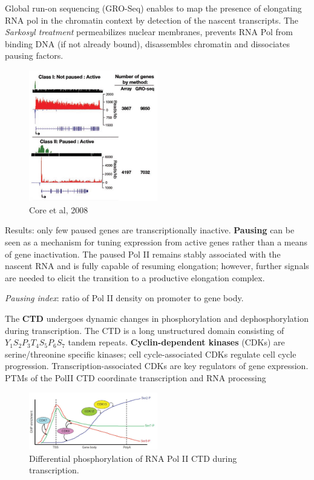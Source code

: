 Global run-on sequencing (GRO-Seq) enables to map the presence of elongating RNA pol in the chromatin context by detection of the nascent transcripts. The \emph{Sarkosyl treatment} permeabilizes nuclear membranes, prevents RNA Pol from binding DNA (if not already bound), disassembles chromatin and dissociates pausing factors.

\begin{figure}
\centering
\includegraphics[width=0.5\textwidth]{../_resources/Screenshot_2022-09-22_at_21-58-03.png}
\caption{Core et al, 2008}
\end{figure}

Results: only few paused genes are transcriptionally inactive.
\textbf{Pausing} can be seen as a mechanism for tuning expression from active genes rather than a means of gene inactivation. The paused Pol II remains stably associated with the nascent RNA and is fully capable of resuming elongation; however, further signals are needed to elicit the transition to a productive elongation complex.

\emph{Pausing index}: ratio of Pol II density on promoter to gene body.

The \textbf{CTD} undergoes dynamic changes in phosphorylation and dephosphorylation during transcription. The CTD is a long unstructured domain consisting of \(Y_1S_2P_3T_4S_5P_6S_7\) tandem repeats. \textbf{Cyclin-dependent kinases} (CDKs) are serine/threonine specific kinases; cell cycle-associated CDKs regulate cell cycle progression. Transcription-associated CDKs are key regulators of gene expression. PTMs of the PolII CTD coordinate transcription and RNA processing

\begin{figure}
\centering
\includegraphics[width=0.5\textwidth]{../_resources/Screenshot_2022-09-22_at_22-09-19.png}
\caption{Differential phosphorylation of RNA Pol II CTD during transcription.}
\label{fig:phCTD}
\end{figure}


